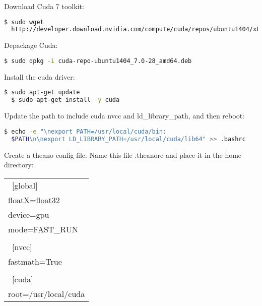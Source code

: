 \noindent Download Cuda 7 toolkit:
\begin{lstlisting}[language=bash]
  $ sudo wget 
  http://developer.download.nvidia.com/compute/cuda/repos/ubuntu1404/x86_64/cuda-repo-ubuntu1404_7.0-28_amd64.deb
\end{lstlisting}


\noindent Depackage Cuda:
\begin{lstlisting}[language=bash]
  $ sudo dpkg -i cuda-repo-ubuntu1404_7.0-28_amd64.deb  
\end{lstlisting}


\noindent Install the cuda driver:
\begin{lstlisting}[language=bash]
  $ sudo apt-get update
  $ sudo apt-get install -y cuda  
\end{lstlisting}

\noindent Update the path to include cuda nvcc and ld\_library\_path, and then reboot:
\begin{lstlisting}[language=bash]
  $ echo -e "\nexport PATH=/usr/local/cuda/bin:
  $PATH\n\nexport LD_LIBRARY_PATH=/usr/local/cuda/lib64" >> .bashrc  
\end{lstlisting}

\noindent  Create a theano config file. Name this file .theanorc and place it in the home directory:\\
\begin{tabular}{ l }
  \hline			
  ~[global] \\
  floatX=float32 \\
  device=gpu \\
  mode=FAST\_RUN \\
  \\
  ~[nvcc] \\
  fastmath=True \\
  \\
  ~[cuda] \\
  root=/usr/local/cuda \\
  \hline  
\end{tabular}
